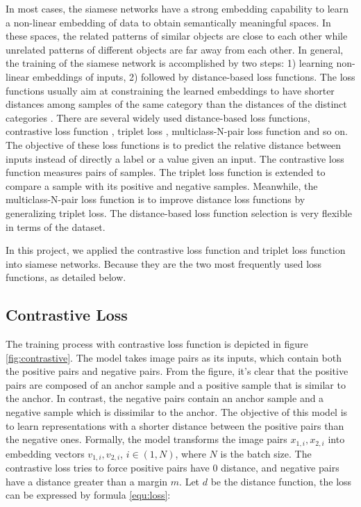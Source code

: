 In most cases, the siamese networks have a strong embedding capability to learn a non-linear embedding of data to obtain semantically meaningful spaces. In these spaces, the related patterns of similar objects are close to each other while unrelated patterns of different objects are far away from each other. In general, the training of the siamese network is accomplished by two steps: 1) learning non-linear embeddings of inputs, 2) followed by distance-based loss functions. The loss functions usually aim at constraining the learned embeddings to have shorter distances among samples of the same category than the distances of the distinct categories \cite{}. There are several widely used distance-based loss functions, contrastive loss function \cite{}, triplet loss \cite{}, multiclass-N-pair loss function \cite{} and so on. The objective of these loss functions is to predict the relative distance between inputs instead of directly a label or a value given an input. The contrastive loss function measures pairs of samples. The triplet loss function is extended to compare a sample with its positive and negative samples. Meanwhile, the multiclass-N-pair loss function is to improve distance loss functions by generalizing triplet loss. The distance-based loss function selection is very flexible in terms of the dataset. 

In this project, we applied the contrastive loss function and triplet loss function into siamese networks. Because they are the two most frequently used loss functions, as detailed below. 

\subsection{Contrastive Loss}
The training process with contrastive loss function is depicted in figure \ref{fig:contrastive}. The model takes image pairs as its inputs, which contain both the positive pairs and negative pairs. From the figure, it's clear that the positive pairs are composed of an anchor sample and a positive sample that is similar to the anchor. In contrast, the negative pairs contain an anchor sample and a negative sample which is dissimilar to the anchor. The objective of this model is to learn representations with a shorter distance between the positive pairs than the negative ones. Formally, the model transforms the image pairs $x_{1,i}, x_{2,i}$ into embedding vectors $v_{1,i}, v_{2,i}$, $i \in (1, N)$, where $N$ is the batch size. The contrastive loss tries to force positive pairs have 0 distance, and negative pairs have a distance greater than a margin $m$. Let $d$ be the distance function, the loss can be expressed by formula \ref{equ:loss}: 

